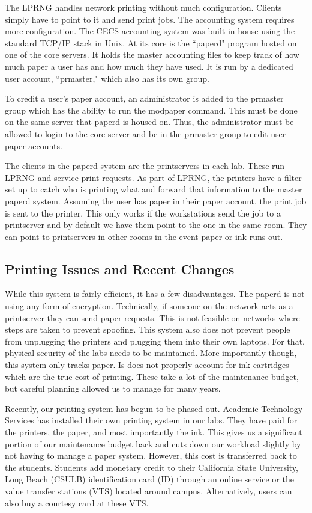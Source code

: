 The LPRNG handles network printing without much configuration.  Clients simply have to point to it and send print jobs.  The accounting system requires more configuration.  The CECS accounting system was built in house using the standard TCP/IP stack in Unix.  At its core is the ``paperd" program hosted on one of the core servers.  It holds the master accounting files to keep track of how much paper a user has and how much they have used.  It is run by a dedicated user account, ``prmaster," which also has its own group.  

To credit a user's paper account, an administrator is added to the prmaster group which has the ability to run the modpaper command.  This must be done on the same server that paperd is housed on.  Thus, the administrator must be allowed to login to the core server and be in the prmaster group to edit user paper accounts.  

The clients in the paperd system are the printservers in each lab.  These run LPRNG and service print requests.  As part of LPRNG, the printers have a filter set up to catch who is printing what and forward that information to the master paperd system.  Assuming the user has paper in their paper account, the print job is sent to the printer. This only works if the workstations send the job to a printserver and by default we have them point to the one in the same room. They can point to printservers in other rooms in the event paper or ink runs out. 

\subsection{Printing Issues and Recent Changes}
While this system is fairly efficient, it has a few disadvantages.  The paperd is not using any form of encryption.  Technically, if someone on the network acts as a printserver they can send paper requests.  This is not feasible on networks where steps are taken to prevent spoofing.  This system also does not prevent people from unplugging the printers and plugging them into their own laptops.  For that, physical security of the labs needs to be maintained.  More importantly though, this system only tracks paper.  Is does not properly account for ink cartridges which are the true cost of printing.  These take a lot of the maintenance budget, but careful planning allowed us to manage for many years.  

Recently, our printing system has begun to be phased out.  Academic Technology Services has installed their own printing system in our labs.  They have paid for the printers, the paper, and most importantly the ink.  This gives us a significant portion of our maintenance budget back and cuts down our workload slightly by not having to manage a paper system.  However, this cost is transferred back to the students. Students add monetary credit to their California State University, Long Beach (CSULB) identification card (ID) through an online service or the value transfer stations (VTS) located around campus.  Alternatively, users can also buy a courtesy card at these VTS.  

